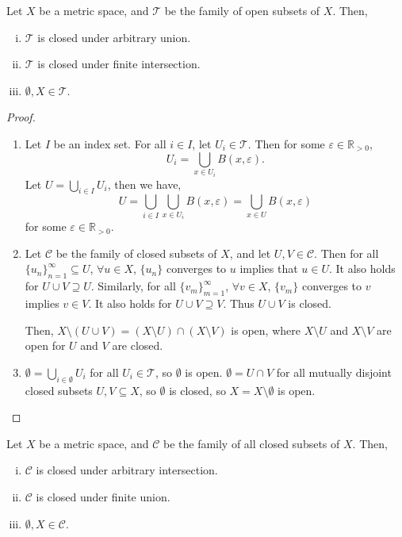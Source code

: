 \begin{lemma}
	\label{lem: open sets are closed under blah blah blah}
	Let $X$ be a metric space, and $\mathcal T$ be the family of open subsets of $X$. Then,
	\begin{enumerate}[(i)]
		\item $\mathcal T$ is closed under arbitrary union.
		\item $\mathcal T$ is closed under finite intersection.
		\item $\emptyset, X \in \mathcal T$.
	\end{enumerate}
\end{lemma}


\begin{proof} \ 
	\begin{enumerate}
		\item Let $I$ be an index set. For all $i \in I$, let $U_i \in \mathcal T$. Then for some $\varepsilon \in \mathbb R_{> 0}$,
			$$
			U_i = \bigcup_{x \in U_i} B(x, \varepsilon).
			$$
			Let $U = \bigcup_{i \in I} U_i$, then we have,
			$$
			U = \bigcup_{i \in I} \bigcup_{x \in U_i} B(x, \varepsilon) = \bigcup_{x \in U} B(x, \varepsilon)
			$$
			for some $\varepsilon \in \mathbb R_{> 0}$.
		
		\item Let $\mathcal C$ be the family of closed subsets of $X$, and let $U, V \in \mathcal C$. Then for all $\{u_n\}_{n = 1}^\infty \subseteq U$, $\forall u \in X$, $\{u_n\}$ converges to $u$ implies that $u \in U$. It also holds for $U \cup V \supseteq U$. Similarly, for all $\{v_m\}_{m = 1}^\infty$, $\forall v \in X$, $\{v_m\}$ converges to $v$ implies $v \in V$. It also holds for $U \cup V \supseteq V$. Thus $U \cup V$ is closed.
			
			Then, $X \setminus (U \cup V) = (X \setminus U) \cap (X \setminus V)$ is open, where $X \setminus U$ and $X \setminus V$ are open for $U$ and $V$ are closed.
		
		\item $\emptyset = \bigcup_{i \in \emptyset} U_i$ for all $U_i \in \mathcal T$, so $\emptyset$ is open. $\emptyset = U \cap V$ for all mutually disjoint closed subsets $U, V \subseteq X$, so $\emptyset$ is closed, so $X = X \setminus \emptyset$ is open.
	\end{enumerate}
\end{proof}


\begin{lemma}
	Let $X$ be a metric space, and $\mathcal C$ be the family of all closed subsets of $X$. Then,
	\begin{enumerate}[(i)]
		\item $\mathcal C$ is closed under arbitrary intersection.
		\item $\mathcal C$ is closed under finite union.
		\item $\emptyset, X \in \mathcal C$.
	\end{enumerate}
\end{lemma}


